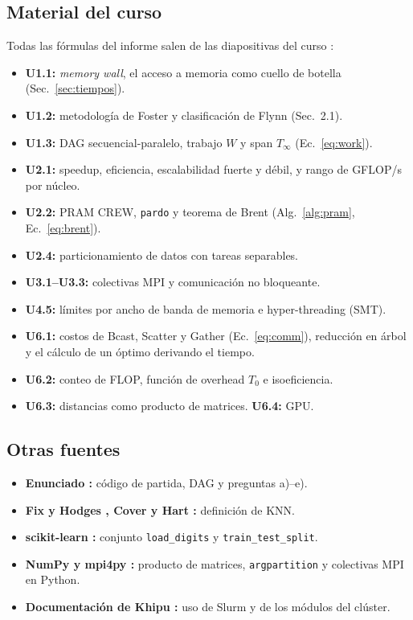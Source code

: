 \documentclass[11pt,a4paper]{article}
\begin{document}
\subsection{Material del curso}
Todas las fórmulas del informe salen de las diapositivas del curso \cite{fiestas}:
\begin{itemize}\setlength{\itemsep}{0pt}
\item \textbf{U1.1:} \emph{memory wall}, el acceso a memoria como cuello de botella (Sec.~\ref{sec:tiempos}).
\item \textbf{U1.2:} metodología de Foster y clasificación de Flynn (Sec.~2.1).
\item \textbf{U1.3:} DAG secuencial-paralelo, trabajo $W$ y span $T_\infty$ (Ec.~\ref{eq:work}).
\item \textbf{U2.1:} speedup, eficiencia, escalabilidad fuerte y débil, y rango de GFLOP/s por núcleo.
\item \textbf{U2.2:} PRAM CREW, \texttt{pardo} y teorema de Brent (Alg.~\ref{alg:pram}, Ec.~\ref{eq:brent}).
\item \textbf{U2.4:} particionamiento de datos con tareas separables.
\item \textbf{U3.1--U3.3:} colectivas MPI y comunicación no bloqueante.
\item \textbf{U4.5:} límites por ancho de banda de memoria e hyper-threading (SMT).
\item \textbf{U6.1:} costos de Bcast, Scatter y Gather (Ec.~\ref{eq:comm}), reducción en árbol y el cálculo de un óptimo derivando el tiempo.
\item \textbf{U6.2:} conteo de FLOP, función de overhead $T_0$ e isoeficiencia.
\item \textbf{U6.3:} distancias como producto de matrices. \textbf{U6.4:} GPU.
\end{itemize}

\subsection{Otras fuentes}
\begin{itemize}\setlength{\itemsep}{1pt}
\item \textbf{Enunciado \cite{enunciado}:} código de partida, DAG y preguntas a)--e).
\item \textbf{Fix y Hodges \cite{fix1951}, Cover y Hart \cite{cover1967}:} definición de KNN.
\item \textbf{scikit-learn \cite{sklearn}:} conjunto \texttt{load\_digits} y \texttt{train\_test\_split}.
\item \textbf{NumPy \cite{numpy} y mpi4py \cite{mpi4py}:} producto de matrices, \texttt{argpartition} y colectivas MPI en Python.
\item \textbf{Documentación de Khipu \cite{khipu}:} uso de Slurm y de los módulos del clúster.
\end{itemize}
\end{document}
